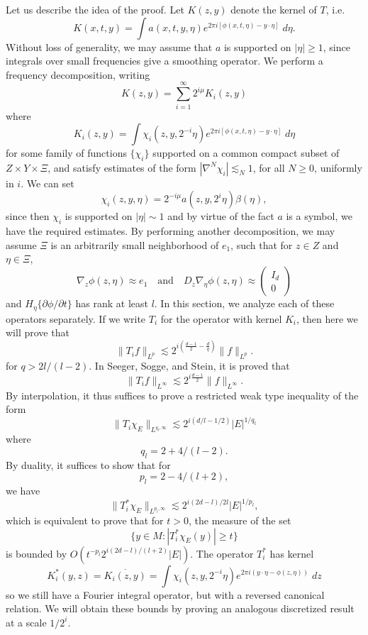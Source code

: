 Let us describe the idea of the proof. Let $K(z,y)$ denote the kernel of $T$, i.e.
%
\[ K(x,t,y) = \int a(x,t,y,\eta) e^{2 \pi i [\phi(x,t,\eta) - y \cdot \eta]}\; d\eta. \]
%
Without loss of generality, we may assume that $a$ is supported on $|\eta| \geq 1$, since integrals over small frequencies give a smoothing operator. We perform a frequency decomposition, writing
%
\[ K(z,y) = \sum_{i = 1}^\infty 2^{i \mu} K_i(z,y) \]
%
where
%
\[ K_i(z,y) = \int \chi_i(z,y,2^{-i} \eta) e^{2 \pi i [\phi(x,t,\eta) - y \cdot \eta]}\; d\eta \]
%
for some family of functions $\{ \chi_i \}$ supported on a common compact subset of $Z \times Y \times \Xi$, and satisfy estimates of the form $|\nabla^N \chi_i| \lesssim_N 1$, for all $N \geq 0$, uniformly in $i$. We can set
%
\[ \chi_i(z,y,\eta) = 2^{-i \mu} a(z,y, 2^i \eta) \beta(\eta), \]
%
since then $\chi_i$ is supported on $|\eta| \sim 1$ and by virtue of the fact $a$ is a symbol, we have the required estimates. By performing another decomposition, we may assume $\Xi$ is an arbitrarily small neighborhood of $e_1$, such that for $z \in Z$ and $\eta \in \Xi$,
%
\[ \nabla_z \phi(z,\eta) \approx e_1 \quad\text{and}\quad D_z \nabla_\eta \phi(z,\eta) \approx \begin{pmatrix} I_d \\ 0 \end{pmatrix} \]
%
and $H_\eta \{ \partial \phi / \partial t \}$ has rank at least $l$. In this section, we analyze each of these operators separately. If we write $T_i$ for the operator with kernel $K_i$, then here we will prove that
%
\[ \| T_i f \|_{L^p} \lesssim 2^{i \left( \frac{d-1}{2} - \frac{d}{q} \right)} \| f \|_{L^p}. \]
%
for $q > 2l/(l-2)$. In Seeger, Sogge, and Stein, it is proved that
%
\[ \| T_i f \|_{L^\infty} \lesssim 2^{i \frac{d-1}{2}} \| f \|_{L^\infty}. \]
%
By interpolation, it thus suffices to prove a restricted weak type inequality of the form
%
\[ \| T_i \chi_E \|_{L^{q_l,\infty}} \lesssim 2^{i(d/l - 1/2)} |E|^{1/q_l} \]
%
where
%
\[ q_l = 2 + 4/(l-2). \]
%
By duality, it suffices to show that for
%
\[ p_l = 2 - 4/(l+2), \]
%
we have
%
\[ \| T_i^* \chi_E \|_{L^{p_l,\infty}} \lesssim 2^{i(2d-l)/2l} |E|^{1/p_l}, \]
%
which is equivalent to prove that for $t > 0$, the measure of the set
%
\[ \{ y \in M : |T_i^* \chi_E(y)| \geq t \} \]
%
is bounded by $O(t^{-p_l} 2^{i(2d-l)/(l+2)} |E| )$. The operator $T_i^*$ has kernel
%
\[ K_i^*(y,z) = \overline{K_i(z,y)} = \int \chi_i(z,y, 2^{-i} \eta) e^{2 \pi i (y \cdot \eta - \phi(z,\eta))}\; dz \]
%
so we still have a Fourier integral operator, but with a reversed canonical relation. We will obtain these bounds by proving an analogous discretized result at a scale $1/2^i$.


